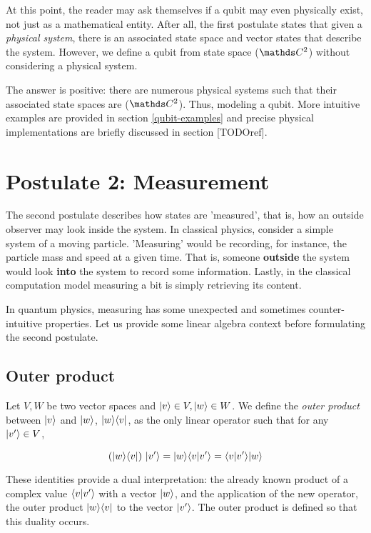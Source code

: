 At this point, the reader may ask themselves if a qubit may even physically exist, not just as a mathematical entity. After all, the first postulate states that given a \emph{physical system}, there is an associated state space and vector states that describe the system. However, we define a qubit from state space ($\C^{2}$) without considering a physical system. 

The answer is positive: there are numerous physical systems such that their associated state spaces are ($\C^{2}$). Thus, modeling a qubit. More intuitive examples are provided in section \ref{qubit-examples} and precise physical implementations are briefly discussed in section [TODOref].


\section{Postulate 2: Measurement}


The second postulate describes how states are 'measured', that is, how an outside observer may look inside the system. In classical physics, consider a simple system of a moving particle. 'Measuring' would be recording, for instance, the particle mass and speed at a given time. That is, someone \textbf{outside} the system would look \textbf{into} the system to record some information. Lastly, in the classical computation model measuring a bit is simply retrieving its content.

In quantum physics, measuring has some unexpected and sometimes counter-intuitive properties. Let us provide some linear algebra context before formulating the second postulate.


\subsection{Outer product}


\begin{definition}
	Let $V, W$ be two vector spaces and $|v\rangle \in V, |w\rangle \in W$. We define the \emph{outer product} between $|v\rangle$ and $|w\rangle$, $|w\rangle\langle v|$, as the only linear operator such that for any $|v'\rangle \in V$, 
	
	$$ (|w\rangle\langle v|) \ |v'\rangle = |w\rangle\langle v|v'\rangle = \langle v|v'\rangle |w\rangle$$
\end{definition}

These identities provide a dual interpretation: the already known product of a complex value $\langle v|v'\rangle$ with a vector $|w\rangle$, and the application of the new operator, the outer product $|w\rangle\langle v|$ to the vector $|v'\rangle$. The outer product is defined so that this duality occurs.

